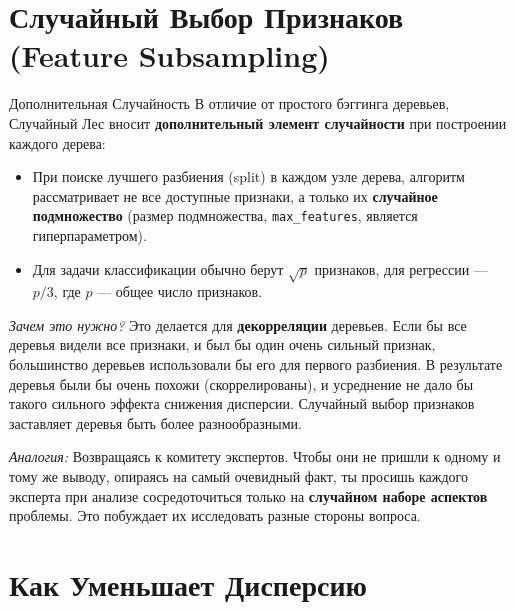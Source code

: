\section{Случайный Выбор Признаков (Feature Subsampling)}

\begin{myexampleblock}{Дополнительная Случайность}
    В отличие от простого бэггинга деревьев, Случайный Лес вносит \textbf{дополнительный элемент случайности} при построении каждого дерева:
    \begin{itemize}
        \item При поиске лучшего разбиения (split) в каждом узле дерева, алгоритм рассматривает не все доступные признаки, а только их \textbf{случайное подмножество} (размер подмножества, \texttt{max\_features}, является гиперпараметром).
        \item Для задачи классификации обычно берут \(\sqrt{p}\) признаков, для регрессии — \(p/3\), где \(p\) — общее число признаков.
    \end{itemize}
    \textit{Зачем это нужно?} Это делается для \textbf{декорреляции} деревьев. Если бы все деревья видели все признаки, и был бы один очень сильный признак, большинство деревьев использовали бы его для первого разбиения. В результате деревья были бы очень похожи (скоррелированы), и усреднение не дало бы такого сильного эффекта снижения дисперсии. Случайный выбор признаков заставляет деревья быть более разнообразными.

    \textit{Аналогия:} Возвращаясь к комитету экспертов. Чтобы они не пришли к одному и тому же выводу, опираясь на самый очевидный факт, ты просишь каждого эксперта при анализе сосредоточиться только на \textbf{случайном наборе аспектов} проблемы. Это побуждает их исследовать разные стороны вопроса.
\end{myexampleblock}

\section{Как Уменьшает Дисперсию}

